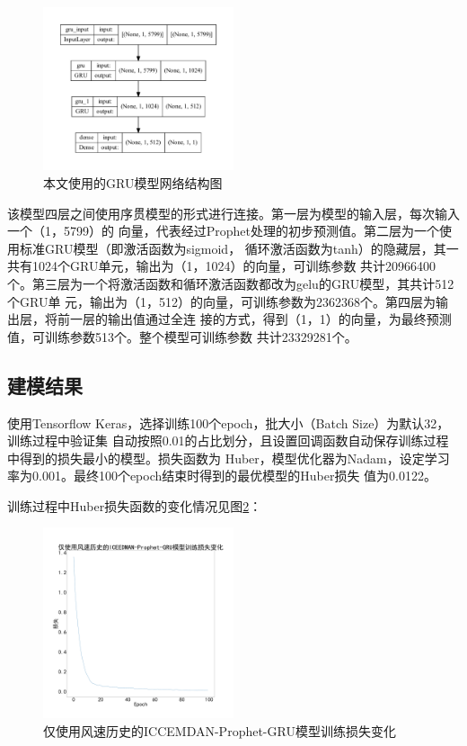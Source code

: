 \documentclass[AutoFakeBold]{LZUThesis}
\begin{document}
\begin{figure}[H]
	\centering
    \includegraphics[width=0.5\textwidth]{figures/gru_model_plot.pdf}
    \caption{本文使用的GRU模型网络结构图}
    \label{fig_gru}
\end{figure}

该模型四层之间使用序贯模型的形式进行连接。第一层为模型的输入层，每次输入一个（1，5799）的
向量，代表经过Prophet处理的初步预测值。第二层为一个使用标准GRU模型（即激活函数为sigmoid，
循环激活函数为tanh）的隐藏层，其一共有1024个GRU单元，输出为（1，1024）的向量，可训练参数
共计20966400个。第三层为一个将激活函数和循环激活函数都改为gelu的GRU模型，其共计512个GRU单
元，输出为（1，512）的向量，可训练参数为2362368个。第四层为输出层，将前一层的输出值通过全连
接的方式，得到（1，1）的向量，为最终预测值，可训练参数513个。整个模型可训练参数
共计23329281个。

\subsection{建模结果}
使用Tensorflow Keras，选择训练100个epoch，批大小（Batch Size）为默认32，训练过程中验证集
自动按照0.01的占比划分，且设置回调函数自动保存训练过程中得到的损失最小的模型。损失函数为
Huber，模型优化器为Nadam，设定学习率为0.001。最终100个epoch结束时得到的最优模型的Huber损失
值为0.0122。

训练过程中Huber损失函数的变化情况见图\ref{fig_wind_prophet_gru_training_loss}：

\begin{figure}[H]
	\centering
    \includegraphics[width=0.5\textwidth]{figures/wind_prophet_gru_training_loss.pdf}
    \caption{仅使用风速历史的ICCEMDAN-Prophet-GRU模型训练损失变化}
    \label{fig_wind_prophet_gru_training_loss}
\end{figure}
\end{document}

